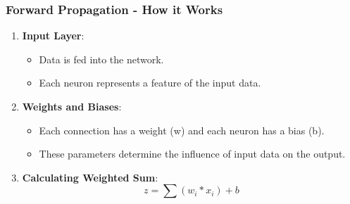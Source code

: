 \documentclass[aspectratio=169]{beamer}
\begin{document}
\begin{frame}[fragile]
    \frametitle{Forward Propagation - How it Works}
    \begin{enumerate}
        \item \textbf{Input Layer}:
        \begin{itemize}
            \item Data is fed into the network.
            \item Each neuron represents a feature of the input data.
        \end{itemize}
        
        \item \textbf{Weights and Biases}:
        \begin{itemize}
            \item Each connection has a weight (w) and each neuron has a bias (b).
            \item These parameters determine the influence of input data on the output.
        \end{itemize}

        \item \textbf{Calculating Weighted Sum}:
        \begin{equation}
            z = \sum (w_i * x_i) + b
        \end{equation}
    \end{enumerate}
\end{frame}
\end{document}
